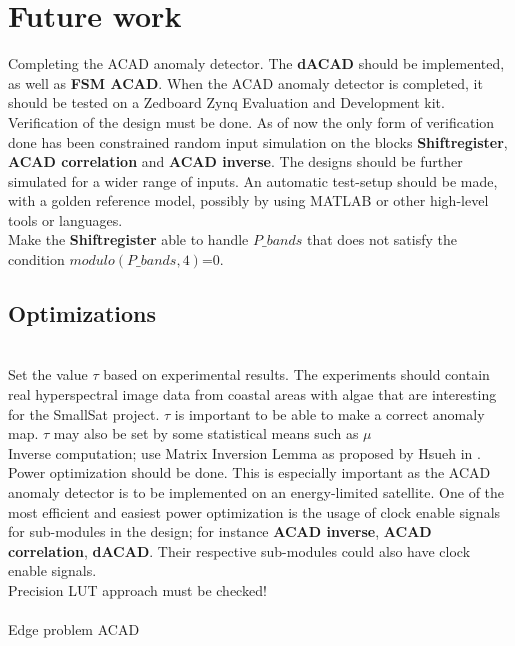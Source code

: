 \section{Future work}
Completing the ACAD anomaly detector. The \textbf{dACAD} should be implemented, as well as \textbf{FSM ACAD}. When the ACAD anomaly detector is completed, it should be tested on a Zedboard Zynq Evaluation and Development kit.\\

Verification of the design must be done. As of now the only form of verification done has been constrained random input simulation on the blocks \textbf{Shiftregister}, \textbf{ACAD correlation} and \textbf{ACAD inverse}. The designs should be further simulated for a wider range of inputs. An automatic test-setup should be made, with a golden reference model, possibly by using MATLAB or other high-level tools or languages. \\

Make the \textbf{Shiftregister} able to handle $P\_bands$ that does not satisfy the condition $modulo(P\_bands,4)$=0. 

\subsection{Optimizations}


\\ 



Set the value $\tau$ based on experimental results. The experiments should contain real hyperspectral image data from coastal areas with algae that are interesting for the SmallSat project. $\tau$ is important to be able to make a correct anomaly map. $\tau$ may also be set by some statistical means such as $\mu$\\

Inverse computation; use Matrix Inversion Lemma as proposed by Hsueh in \cite{hsueh_master_thesis}.\\

Power optimization should be done. This is especially important as the ACAD anomaly detector is to be implemented on an energy-limited satellite. One of the most efficient and easiest power optimization is the usage of clock enable signals for sub-modules in the design; for instance \textbf{ACAD inverse}, \textbf{ACAD correlation}, \textbf{dACAD}. Their respective sub-modules could also have clock enable signals.\\

Precision LUT approach must be checked!\\

\\
Edge problem ACAD